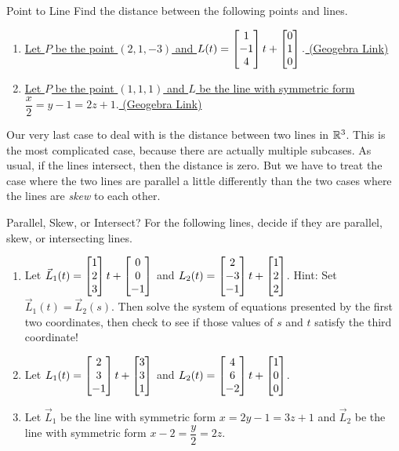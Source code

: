 \begin{exercise}{Point to Line}
Find the distance between the following points and lines.
\vspace{1em}
\begin{enumerate}
\item \href{https://www.geogebra.org/3d/skreh6sd}{Let $P$ be the point $(2,1,-3)$ and $L(t)=\begin{bmatrix}1\\-1\\4\end{bmatrix}t+\begin{bmatrix}0\\1\\0\end{bmatrix}.$ (Geogebra Link)}
\vspace{1em}
\item \href{https://www.geogebra.org/3d/sfhumpus}{Let $P$ be the point $(1,1,1)$ and $L$ be the line with symmetric form $\dfrac{x}{2}=y-1=2z+1.$ (Geogebra Link)}
\end{enumerate}
\end{exercise}

Our very last case to deal with is the distance between two lines in $\mathbb{R}^3$. This is the most complicated case, because there are actually multiple subcases. As usual, if the lines intersect, then the distance is zero. But we have to treat the case where the two lines are parallel a little differently than the two cases where the lines are \textit{skew} to each other.

\begin{exercise}{Parallel, Skew, or Intersect?}
For the following lines, decide if they are parallel, skew, or intersecting lines.
\vspace{1em}
\begin{enumerate}
\item Let $\vec{L}_1(t)=\begin{bmatrix}1\\2\\3\end{bmatrix}t+\begin{bmatrix}0\\0\\-1\end{bmatrix}$ and $L_2(t)=\begin{bmatrix}2\\-3\\-1\end{bmatrix}t+\begin{bmatrix}1\\2\\2\end{bmatrix}$. Hint: Set $\vec{L}_1(t)=\vec{L}_2(s)$. Then solve the system of equations presented by the first two coordinates, then check to see if those values of $s$ and $t$ satisfy the third coordinate!
\vspace{1em}
\item Let $L_1(t)=\begin{bmatrix}2\\3\\-1\end{bmatrix}t+\begin{bmatrix}3\\3\\1\end{bmatrix}$ and $L_2(t)=\begin{bmatrix}4\\6\\-2\end{bmatrix}t+\begin{bmatrix}1\\0\\0\end{bmatrix}$.
\vspace{1em}
\item Let $\vec{L}_1$ be the line with symmetric form $x=2y-1=3z+1 $ and $\vec{L}_2$ be the line with symmetric form $x-2=\dfrac{y}{2}=2z.$
\end{enumerate}
\end{exercise}


